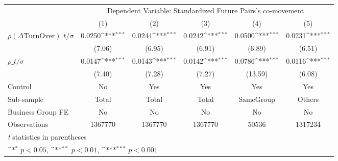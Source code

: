{
\def\sym#1{\ifmmode^{#1}\else\(^{#1}\)\fi}
\begin{tabular}{l*{5}{c}}
\hline\hline
                &\multicolumn{5}{c}{Dependent Variable: Standardized Future Pairs's co-movement}               \\\cmidrule(lr){2-6}
                &\multicolumn{1}{c}{(1)}         &\multicolumn{1}{c}{(2)}         &\multicolumn{1}{c}{(3)}         &\multicolumn{1}{c}{(4)}         &\multicolumn{1}{c}{(5)}         \\
\hline
 $ {\rho(\Delta \text{TurnOver})\_t} / \sigma $ &   0.0250\sym{***}&   0.0244\sym{***}&   0.0242\sym{***}&   0.0500\sym{***}&   0.0231\sym{***}\\
                &   (7.06)         &   (6.95)         &   (6.91)         &   (6.89)         &   (6.51)         \\
[1em]
 $ {\rho\_t} / \sigma $ &   0.0147\sym{***}&   0.0143\sym{***}&   0.0142\sym{***}&   0.0786\sym{***}&   0.0116\sym{***}\\
                &   (7.40)         &   (7.28)         &   (7.27)         &  (13.59)         &   (6.08)         \\
\hline
Control         &       No         &      Yes         &      Yes         &      Yes         &      Yes         \\
Sub-sample      &    Total         &    Total         &    Total         &SameGroup         &   Others         \\
Business Group FE&       No         &       No         &       No         &       No         &       No         \\
Observations    &  1367770         &  1367770         &  1367770         &    50536         &  1317234         \\
\hline\hline
\multicolumn{6}{l}{\footnotesize \textit{t} statistics in parentheses}\\
\multicolumn{6}{l}{\footnotesize \sym{*} \(p<0.05\), \sym{**} \(p<0.01\), \sym{***} \(p<0.001\)}\\
\end{tabular}
}
